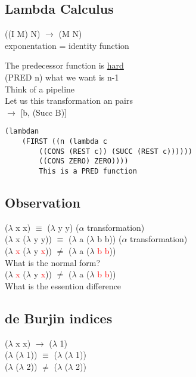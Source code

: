\documentclass{article}
\begin{document}
\subsection*{Lambda Calculus}
\begin{flushleft}
((I M) N) $\rightarrow$ (M N)\\
\doublespacing
exponentation = identity function

\doublespacing
The predecessor function is \underline{hard}\\
(PRED n) what we want is n-1\\
Think of a pipeline\\
Let us this transformation an pairs\\
\center
[a b] $\rightarrow$ [b, (Succ B)]
\begin{verbatim}
(lambdan
    (FIRST ((n (lambda c
        ((CONS (REST c)) (SUCC (REST c))))))
        ((CONS ZERO) ZERO))))
        This is a PRED function
\end{verbatim}
\end{flushleft}

\subsection*{Observation}
\begin{flushleft}
($\lambda$ x x) $\equiv$ ($\lambda$ y y) ($\alpha$ transformation)\\
($\lambda$ x ($\lambda$ y y)) $\equiv$ ($\lambda$ a ($\lambda$ b b)) ($\alpha$ transformation)\\
($\lambda$ \textcolor{red}{x} ($\lambda$ y \textcolor{red}{x})) $\neq$ ($\lambda$ a ($\lambda$ \textcolor{red}{b} \textcolor{red}{b}))\\
 \doublespacing
What is the normal form?\\
($\lambda$ \textcolor{red}{x} ($\lambda$ y \textcolor{red}{x})) $\neq$ ($\lambda$ a ($\lambda$ \textcolor{red}{b} \textcolor{red}{b}))\\
What is the essention difference
\end{flushleft}

\subsection*{de Burjin indices}
\begin{flushleft}
($\lambda$ x x) $\rightarrow$ ($\lambda$ 1)\\
($\lambda$ ($\lambda$ 1)) $\equiv$ ($\lambda$ ($\lambda$ 1))\\
($\lambda$ ($\lambda$ 2)) $\neq$ ($\lambda$ ($\lambda$ 2))
\end{flushleft}
\end{document}
